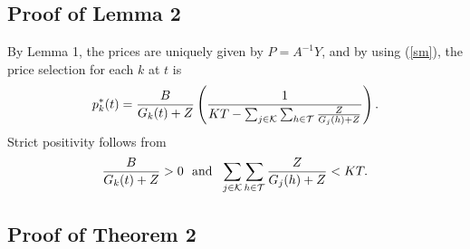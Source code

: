 \subsection{Proof of Lemma 2} By Lemma 1, the prices are uniquely given by $P=A^{-1}Y$, and by using (\ref{sm}), the price selection for each $k$ at $t$ is 
$$p^*_k(t)=\frac{B}{G_k(t)+Z}\left(\frac{1}{KT-\sum_{j\in {\cal K}}\sum_{h\in {\cal T}}\frac{Z}{G_j(h)+Z}}\right).$$
 Strict positivity follows from $$\frac{B}{G_k(t)+Z}>0  \  \ \text{and} \ \ \sum_{j\in \scr{K}}\sum_{h\in \scr{T}}\frac{Z}{G_j(h)+Z}<KT.$$

\subsection{Proof of Theorem 2}
